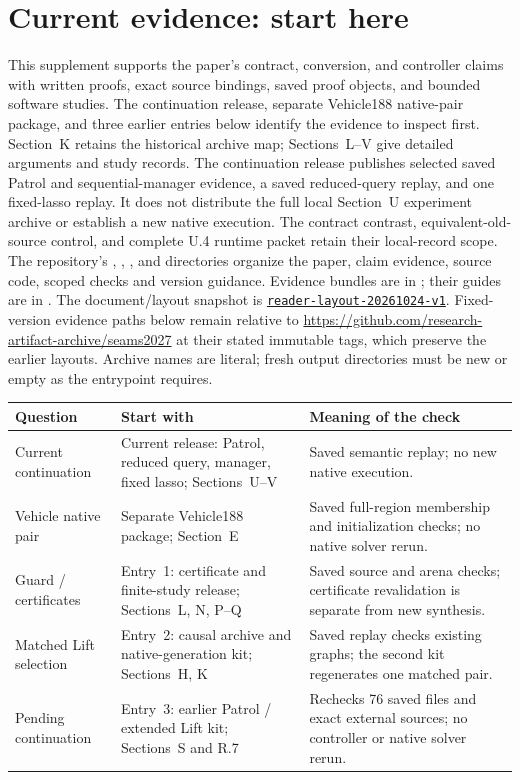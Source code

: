 \section*{Current evidence: start here}
This supplement supports the paper's contract, conversion, and controller
claims with written proofs, exact source bindings, saved proof objects,
and bounded software studies. The continuation release, separate Vehicle188
native-pair package, and three earlier entries below identify the evidence
to inspect first.
Section~K retains the historical archive map; Sections~L--V give detailed
arguments and study records. The continuation release publishes selected saved
Patrol and sequential-manager evidence, a saved reduced-query replay, and
one fixed-lasso replay. It does not distribute the full local Section~U
experiment archive or establish a new native execution. The contract
contrast, equivalent-old-source control, and complete U.4 runtime packet
retain their local-record scope. The repository's ,
, ,  and  directories
organize the paper, claim evidence, source code, scoped checks and version
guidance. Evidence bundles are in ; their guides
are in . The document/layout snapshot is
\href{https://github.com/research-artifact-archive/seams2027/tree/reader-layout-20261024-v1}{\nolinkurl{reader-layout-20261024-v1}}.
Fixed-version evidence paths below remain relative to
\url{https://github.com/research-artifact-archive/seams2027} at their stated
immutable tags, which preserve the earlier layouts. Archive names are literal;
fresh output directories must be new or empty as the entrypoint requires.

\begin{center}\small
\begin{tabular}{@{}L{25mm}L{61mm}L{64mm}@{}}\toprule
Question & Start with & Meaning of the check\\\midrule
Current continuation & Current release: Patrol, reduced query, manager, fixed lasso; Sections~U--V & Saved semantic replay; no new native execution.\\
Vehicle native pair & Separate Vehicle188 package; Section~E & Saved full-region membership and initialization checks; no native solver rerun.\\
Guard / certificates & Entry~1: certificate and finite-study release; Sections~L, N, P--Q & Saved source and arena checks; certificate revalidation is separate from new synthesis.\\
Matched Lift selection & Entry~2: causal archive and native-generation kit; Sections~H, K & Saved replay checks existing graphs; the second kit regenerates one matched pair.\\
Pending continuation & Entry~3: earlier Patrol / extended Lift kit; Sections~S and R.7 & Rechecks 76 saved files and exact external sources; no controller or native solver rerun.\\\bottomrule
\end{tabular}
\end{center}

